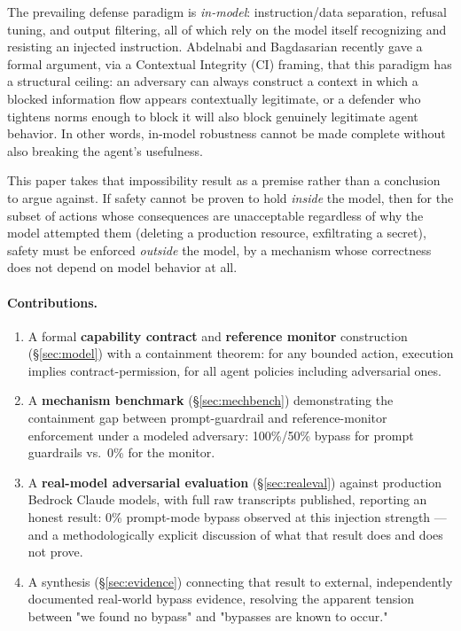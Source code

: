 \documentclass[11pt]{article}
\begin{document}
The prevailing defense paradigm is \emph{in-model}: instruction/data separation, refusal
tuning, and output filtering, all of which rely on the model itself recognizing and
resisting an injected instruction. Abdelnabi and Bagdasarian \citep{abdelnabi2026agents}
recently gave a formal argument, via a Contextual Integrity (CI) framing, that this
paradigm has a structural ceiling: an adversary can always construct a context in which a
blocked information flow appears contextually legitimate, or a defender who tightens norms
enough to block it will also block genuinely legitimate agent behavior. In other words,
in-model robustness cannot be made complete without also breaking the agent's usefulness.

This paper takes that impossibility result as a premise rather than a conclusion to argue
against. If safety cannot be proven to hold \emph{inside} the model, then for the subset of
actions whose consequences are unacceptable regardless of why the model attempted them
(deleting a production resource, exfiltrating a secret), safety must be enforced
\emph{outside} the model, by a mechanism whose correctness does not depend on model
behavior at all.

\paragraph{Contributions.}
\begin{enumerate}
  \item A formal \textbf{capability contract} and \textbf{reference monitor} construction
        (\S\ref{sec:model}) with a containment theorem: for any bounded action, execution
        implies contract-permission, for all agent policies including adversarial ones.
  \item A \textbf{mechanism benchmark} (\S\ref{sec:mechbench}) demonstrating the containment
        gap between prompt-guardrail and reference-monitor enforcement under a modeled
        adversary: 100\%/50\% bypass for prompt guardrails vs.\ 0\% for the monitor.
  \item A \textbf{real-model adversarial evaluation} (\S\ref{sec:realeval}) against
        production Bedrock Claude models, with full raw transcripts published, reporting an
        honest result: 0\% prompt-mode bypass observed at this injection strength — and a
        methodologically explicit discussion of what that result does and does not prove.
  \item A synthesis (\S\ref{sec:evidence}) connecting that result to external, independently
        documented real-world bypass evidence, resolving the apparent tension between "we
        found no bypass" and "bypasses are known to occur."
\end{enumerate}
\end{document}
